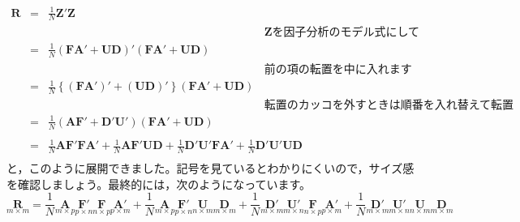 \documentclass{ltjsbook}
\begin{document}
\begin{equation}
	\begin{array}{lll}
		\bm{R} & = & \frac{1}{N} \bm{Z}'\bm{Z}                                                                                                                                                      \\
		       &   & \hspace{8cm}\text{$\bm{Z}$を因子分析のモデル式にして}                                                                                                                                       \\
		       & = & \frac{1}{N}(\bm{F} \bm{A} ' + \bm{U} \bm{D})'(\bm{F} \bm{A} ' + \bm{U} \bm{D})                                                                                                 \\
		       &   & \hspace{8cm}\text{前の項の転置を中に入れます}                                                                                                                                               \\
		       & = & \frac{1}{N}\left \{ (\bm{F} \bm{A} ')'+(\bm{U} \bm{D})' \right \}(\bm{F} \bm{A} ' + \bm{U} \bm{D})                                                                             \\
		       &   & \hspace{8cm}\text{転置のカッコを外すときは順番を入れ替えて転置}                                                                                                                                      \\
		       & = & \frac{1}{N}(\bm{A} \bm{F} ' + \bm{D}' \bm{U} ')(\bm{F} \bm{A} ' + \bm{U} \bm{D})                                                                                               \\
		       &   & \hspace{8cm}                                                                                                                                                                   \\
		       & = & \frac{1}{N}\bm{A} \bm{F}' \bm{F} \bm{A}' + \frac{1}{N} \bm{A} \bm{F}' \bm{U} \bm{D} + \frac{1}{N} \bm{D}' \bm{U} ' \bm{F} \bm{A} ' + \frac{1}{N} \bm{D}' \bm{U}' \bm{U} \bm{D} \\
	\end{array}
\end{equation}
と，このように展開できました。記号を見ているとわかりにくいので，サイズ感を確認しましょう。最終的には，次のようになっています。
\[
	\underset{m \times m}{\bm{R}} =
	\frac{1}{N} \underset{m \times p}{\bm{A}} \underset{p \times n}{\bm{F}'} \underset{n \times p}{\bm{F}} \underset{p \times m}{\bm{A}'} +
	\frac{1}{N} \underset{m \times p}{\bm{A}} \underset{p \times n}{\bm{F}'} \underset{n \times m}{\bm{U}} \underset{m \times m}{\bm{D}} +
	\frac{1}{N} \underset{m \times m}{\bm{D}'} \underset{m \times n}{\bm{U}'} \underset{n \times p}{\bm{F}} \underset{p \times m}{\bm{A}'} +
	\frac{1}{N} \underset{m \times m}{\bm{D}'} \underset{m \times n}{\bm{U}'} \underset{n \times m}{\bm{U}} \underset{m \times m}{\bm{D}}
\]
\end{document}
